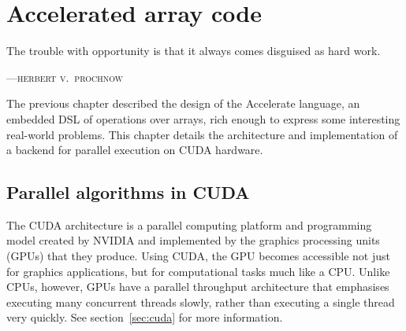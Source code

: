 
\chapter{Accelerated array code}
\label{ch:implementation}
\epigraph{The trouble with opportunity is that it always comes disguised as hard work.}%
{\textsc{---herbert v.\ prochnow}}

The previous chapter described the design of the Accelerate language, an
embedded DSL of operations over arrays, rich enough to express some interesting
real-world problems. This chapter details the architecture and implementation of
a backend for parallel execution on CUDA hardware.


\section{Parallel algorithms in CUDA}
\label{sec:parallel_algorithms_in_cuda}

The CUDA architecture is a parallel computing platform and programming model
created by NVIDIA and implemented by the graphics processing units
(GPUs)
that they produce. Using CUDA, the GPU becomes accessible not just for
graphics applications, but for computational tasks much like a CPU\@. Unlike
CPUs, however, GPUs have a parallel throughput architecture that emphasises
executing many concurrent threads slowly, rather than executing a single thread
very quickly.
See section~\ref{sec:cuda} for more information.

